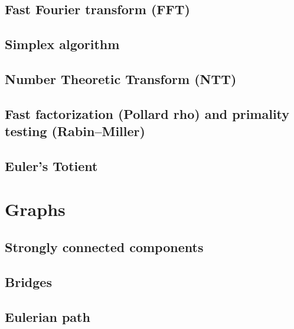 \documentclass[9pt]{extarticle}
\begin{document}
\begin{multicols*}{3}
\subsection{Fast Fourier transform (FFT)} %


\subsection{Simplex algorithm} %


\subsection{Number Theoretic Transform (NTT)}


\subsection{Fast factorization (Pollard rho) and primality testing
(Rabin--Miller)} %


\subsection{Euler's Totient} %


\section{Graphs}

\subsection{Strongly connected components} %


\subsection{Bridges} %


\subsection{Eulerian path} %



\end{multicols*}
\end{document}

